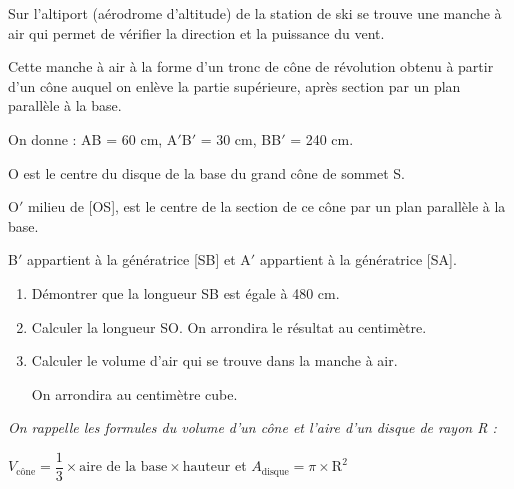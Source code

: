 
\medskip

Sur l'altiport (aérodrome d'altitude) de la station de ski se trouve une manche à air qui permet de vérifier la direction et la puissance du vent.

Cette manche à air à la forme d'un tronc de cône de révolution obtenu à partir d'un cône auquel on enlève la partie supérieure, après section par un plan parallèle à la base.

\hfill
{}

On donne : AB = 60 cm, A$'$B$'$ = 30 cm, BB$'$ = 240 cm.

O est le centre du disque de la base du grand cône de sommet S.

O$'$ milieu de [OS], est le centre de la section de ce cône par un plan parallèle à la base.

B$'$ appartient à la génératrice [SB] et A$'$ appartient à la génératrice [SA].

\begin{enumerate}
	\item Démontrer que la longueur SB est égale à 480 cm.
	
	\item Calculer la longueur SO. On arrondira le résultat au centimètre.
	
	\item Calculer le volume d'air qui se trouve dans la manche à air.
	
On arrondira au centimètre cube.
\end{enumerate}

\emph{On rappelle les formules du volume d'un cône et l'aire d'un disque de rayon R :}

\hfill $V_{\mathrm{cône}} = \dfrac{1}{3} \times \text{aire de la base} \times \text{hauteur}$ \hfill et \hfill $A_{\mathrm{disque}} = \pi \times \text{R}^2$\hfill ~

\vspace{0,5cm}

